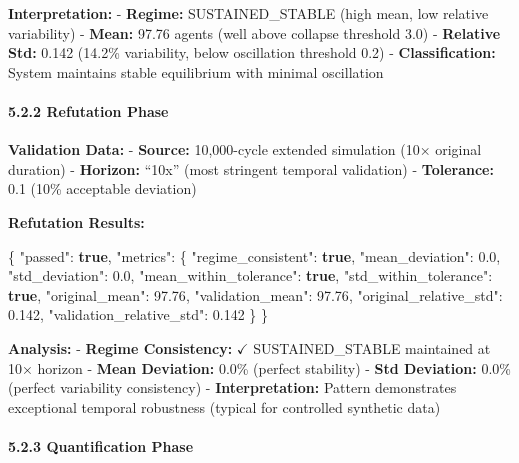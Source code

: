 \documentclass[
]{article}
\newenvironment{Shaded}{}{}
\newcommand{\DataTypeTok}[1]{\textcolor[rgb]{0.56,0.13,0.00}{#1}}
\newcommand{\FloatTok}[1]{\textcolor[rgb]{0.25,0.63,0.44}{#1}}
\newcommand{\FunctionTok}[1]{\textcolor[rgb]{0.02,0.16,0.49}{#1}}
\newcommand{\KeywordTok}[1]{\textcolor[rgb]{0.00,0.44,0.13}{\textbf{#1}}}
\begin{document}
\textbf{Interpretation:} - \textbf{Regime:} SUSTAINED\_STABLE (high
mean, low relative variability) - \textbf{Mean:} 97.76 agents (well
above collapse threshold 3.0) - \textbf{Relative Std:} 0.142 (14.2\%
variability, below oscillation threshold 0.2) - \textbf{Classification:}
System maintains stable equilibrium with minimal oscillation

\paragraph{5.2.2 Refutation Phase}\label{refutation-phase}

\textbf{Validation Data:} - \textbf{Source:} 10,000-cycle extended
simulation (10× original duration) - \textbf{Horizon:} ``10x'' (most
stringent temporal validation) - \textbf{Tolerance:} 0.1 (10\%
acceptable deviation)

\textbf{Refutation Results:}

\begin{Shaded}
\begin{Highlighting}[]
\FunctionTok{\{}
  \DataTypeTok{"passed"}\FunctionTok{:} \KeywordTok{true}\FunctionTok{,}
  \DataTypeTok{"metrics"}\FunctionTok{:} \FunctionTok{\{}
    \DataTypeTok{"regime\_consistent"}\FunctionTok{:} \KeywordTok{true}\FunctionTok{,}
    \DataTypeTok{"mean\_deviation"}\FunctionTok{:} \FloatTok{0.0}\FunctionTok{,}
    \DataTypeTok{"std\_deviation"}\FunctionTok{:} \FloatTok{0.0}\FunctionTok{,}
    \DataTypeTok{"mean\_within\_tolerance"}\FunctionTok{:} \KeywordTok{true}\FunctionTok{,}
    \DataTypeTok{"std\_within\_tolerance"}\FunctionTok{:} \KeywordTok{true}\FunctionTok{,}
    \DataTypeTok{"original\_mean"}\FunctionTok{:} \FloatTok{97.76}\FunctionTok{,}
    \DataTypeTok{"validation\_mean"}\FunctionTok{:} \FloatTok{97.76}\FunctionTok{,}
    \DataTypeTok{"original\_relative\_std"}\FunctionTok{:} \FloatTok{0.142}\FunctionTok{,}
    \DataTypeTok{"validation\_relative\_std"}\FunctionTok{:} \FloatTok{0.142}
  \FunctionTok{\}}
\FunctionTok{\}}
\end{Highlighting}
\end{Shaded}

\textbf{Analysis:} - \textbf{Regime Consistency:} $\checkmark$ SUSTAINED\_STABLE
maintained at 10× horizon - \textbf{Mean Deviation:} 0.0\% (perfect
stability) - \textbf{Std Deviation:} 0.0\% (perfect variability
consistency) - \textbf{Interpretation:} Pattern demonstrates exceptional
temporal robustness (typical for controlled synthetic data)

\paragraph{5.2.3 Quantification Phase}\label{quantification-phase}
\end{document}
